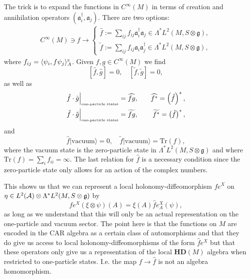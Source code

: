 \documentclass[letterpaper,11pt]{article}
\newcommand{\nn}{\nonumber}
\def\ca{{\cal A}}
\begin{document}
The trick is to expand the functions in $C^\infty(M)$ in terms of creation and annihilation operators $( \mathfrak{a}^\dagger_i ,\mathfrak{a}_j)$. There are two options:
\begin{eqnarray}
C^\infty(M) \ni f \longrightarrow \left\{
\begin{array}{l}
 \hat{f}:= \sum_{ij}  f_{ij}  \mathfrak{a}^\dagger_i \mathfrak{a}_j \in \Lambda^*  L^2(M,S\otimes \mathfrak{g}),
\\ 
 \tilde{f}:= \sum_{ij}  f_{ij}  \mathfrak{a}_i \mathfrak{a}^\dagger_j \in \Lambda^*  L^2(M,S\otimes \mathfrak{g}),
\end{array}\right.
\end{eqnarray}
where $f_{ij}= \langle \psi_i  , f \psi_j\rangle_{A}^{\mbox{\tiny S}} $. Given $f,g\in C^\infty(M)$ we find 
$$
[\hat{f}, \hat{g}]=0,  \quad [\tilde{f}, \tilde{g}]=0,  
$$
as well as 
\begin{eqnarray}
\hat{f} \cdot\hat{g}\Big\vert_{\mbox{\tiny one-particle states}} = \widehat{fg}, &&\quad \widehat{f^*} = \left(\hat{f}\right)^*,
\nn\\
\tilde{f} \cdot\tilde{g}\Big\vert_{\mbox{\tiny one-particle states}} = \widetilde{fg}, &&\quad \widetilde{f^*} = \left(\tilde{f}\right)^*,
\end{eqnarray}
and
$$
\hat{f} \vert \mbox{vacuum}\rangle =0, \quad \tilde{f} \vert \mbox{vacuum}\rangle =\mbox{Tr}(f),
$$
where the vacuum state is the zero-particle state in $\Lambda^*L^2(M,S\otimes\mathfrak{g})$ and where $\mbox{Tr}(f)= \sum_i f_{ii}=\infty$. The last relation for $\hat{f}$ is a necessary condition since the zero-particle state only allows for an action of the complex numbers.

This shows us that we can represent a local holonomy-diffeomorphism $f e^X$ on $\eta\in L^2 (\ca)\otimes \Lambda^*  L^2(M,S\otimes \mathfrak{g})$ by 
\begin{equation}
f e^X(\xi\otimes\psi)(A)= \xi(A)\hat{f}e^X_A(\psi),
\label{actbundle2}
\end{equation}
as long as we understand that this will only be an actual representation on the one-particle and vacuum sector.
The point here is that the functions on $M$ are encoded in the CAR algebra as a certain class of automorphisms and that they do give us access to local holonomy-diffeomorphisms of the form
$
\hat{f} e^{X} %
$
but that these operators only give us a representation of the local $\mathbf{HD}(M)$ algebra when restricted to one-particle states. I.e. the map $f\rightarrow \hat{f}$ is not an algebra homomorphism.
\end{document}
